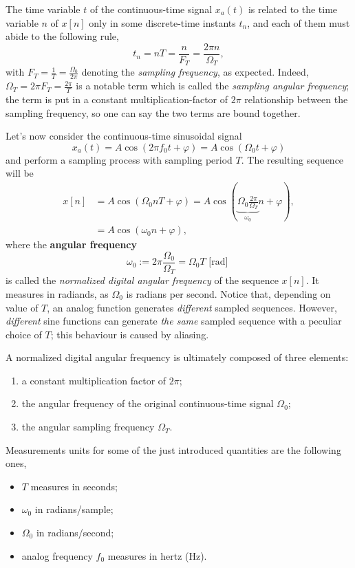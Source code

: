 \documentclass[\documentfontsize, twocolumn]{\classname}
\begin{document}
The time variable $t$ of the con\-ti\-nuo\-us-time signal $x_a(t)$ is related to the time variable $n$ of $x[n]$ only in some discrete-time instants $t_n$, and each of them must abide to the following rule,
\begin{equation}\label{eqn:timeSamplingRule}
    t_n = nT = \frac n {F_T} = \frac {2\pi n} {\Omega_T},
\end{equation}
with $F_T = \frac 1 T = \frac {\Omega_0} {2\pi}$ denoting the \emph{sampling frequency}, as expected. Indeed, $\Omega_T = 2\pi F_T = \frac{2\pi}{T}$ is a notable term which is called the \emph{sampling angular frequency}; the term is put in a constant multiplication-factor of $2\pi$ relationship between the sampling frequency, so one can say the two terms are bound together.

Let's now consider the con\-ti\-nuo\-us-time sinusoidal signal
\[
    x_a(t) = A\cos{(2\pi f_0 t + \varphi)} = A\cos{(\Omega_0 t + \varphi)}
\]
and perform a sampling process with sampling period $T$.
The resulting se\-quen\-ce will be
\begin{align}
    x[n] &= A\cos{(\Omega_0 n T + \varphi)} = A\cos{(\underbrace{\Omega_0 \frac{2\pi}{\Omega_T}}_{\omega_0} n + \varphi)}, \\
         &= A\cos{(\omega_0 n + \varphi)},
\end{align}
where the \textbf{angular frequency} 
\[
    \omega_0 := 2 \pi \frac {\Omega_0} {\Omega_T} = \Omega_0 T \mbox { [rad] }
\]
is called the \emph{normalized digital angular frequency} of the se\-quen\-ce $x[n]$. It measures in radiands, as $\Omega_0$ is radians per second. Notice that, depending on value of $T$, an analog function generates \emph{different} sampled se\-quen\-ces. However, \emph{different} sine functions can generate \emph{the same} sampled se\-quen\-ce with a peculiar choice of $T$; this behaviour is caused by aliasing.

A normalized digital angular frequency is ultimately composed of three elements:
\begin{enumerate}
    \item a constant multiplication factor of $2\pi$;
    \item the angular frequency of the original continuous-time signal $\Omega_0$;
    \item the angular sampling frequency $\Omega_T$.
\end{enumerate}

Measurements units for some of the just introduced quantities are the following ones,
\begin{itemize}
    \item $T$ measures in seconds;
    \item $\omega_0$ in radians/sample;
    \item $\Omega_0$ in radians/second;
    \item analog frequency $f_0$ measures in hertz (Hz).
\end{itemize}
\end{document}
